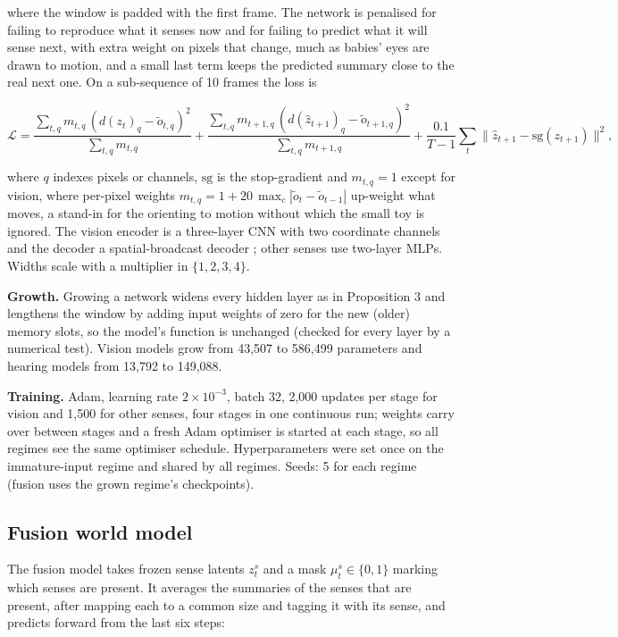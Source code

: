 \documentclass{article}
\begin{document}
where the window is padded with the first frame. The network is penalised for failing to reproduce what it senses now and for failing to predict what it will sense next, with extra weight on pixels that change, much as babies' eyes are drawn to motion, and a small last term keeps the predicted summary close to the real next one. On a sub-sequence of 10 frames the loss is

\begin{equation}\mathcal L=\frac{\sum_{t,q}m_{t,q}\,(d(z_t)_q-\tilde o_{t,q})^2}{\sum_{t,q}m_{t,q}}+\frac{\sum_{t,q}m_{t+1,q}\,(d(\hat z_{t+1})_q-\tilde o_{t+1,q})^2}{\sum_{t,q}m_{t+1,q}}+\frac{0.1}{T-1}\sum_t\lVert\hat z_{t+1}-\mathrm{sg}(z_{t+1})\rVert^2,\end{equation}

where \(q\) indexes pixels or channels, \(\mathrm{sg}\) is the stop-gradient and \(m_{t,q}=1\) except for vision, where per-pixel weights \(m_{t,q}=1+20\,\max_c|\tilde o_t-\tilde o_{t-1}|\) up-weight what moves, a stand-in for the orienting to motion without which the small toy is ignored. The vision encoder is a three-layer CNN with two coordinate channels and the decoder a spatial-broadcast decoder \autocite{watters2019spatial}; other senses use two-layer MLPs. Widths scale with a multiplier in \(\{1,2,3,4\}\).

\textbf{Growth.} Growing a network widens every hidden layer as in Proposition 3 and lengthens the window by adding input weights of zero for the new (older) memory slots, so the model's function is unchanged (checked for every layer by a numerical test). Vision models grow from 43,507 to 586,499 parameters and hearing models from 13,792 to 149,088.

\textbf{Training.} Adam, learning rate \(2\times10^{-3}\), batch 32, 2,000 updates per stage for vision and 1,500 for other senses, four stages in one continuous run; weights carry over between stages and a fresh Adam optimiser is started at each stage, so all regimes see the same optimiser schedule. Hyperparameters were set once on the immature-input regime and shared by all regimes. Seeds: 5 for each regime (fusion uses the grown regime's checkpoints).

\hypertarget{fusion-world-model}{%
\subsection{Fusion world model}\label{fusion-world-model}}

The fusion model takes frozen sense latents \(z^s_t\) and a mask \(\mu^s_t\in\{0,1\}\) marking which senses are present. It averages the summaries of the senses that are present, after mapping each to a common size and tagging it with its sense, and predicts forward from the last six steps:
\end{document}
